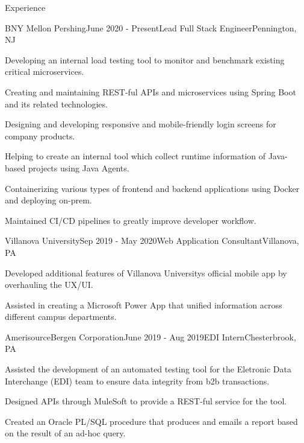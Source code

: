 \documentclass[
	11pt, %
]{resume} %
\begin{document}
\begin{rSection}{Experience}

	\begin{rSubsection}{BNY Mellon \textbar{} Pershing}{June 2020 - Present}{Lead Full Stack Engineer}{Pennington, NJ}
		\item Developing an internal load testing tool to monitor and benchmark existing critical microservices.
		\item Creating and maintaining REST-ful APIs and microservices using Spring Boot and its related technologies.
		\item Designing and developing responsive and mobile-friendly login screens for company products.
		\item Helping to create an internal tool which collect runtime information of Java-based projects using Java Agents.
		\item Containerizing various types of frontend and backend applications using Docker and deploying on-prem.
		\item Maintained CI/CD pipelines to greatly improve developer workflow.
	\end{rSubsection}


	\begin{rSubsection}{Villanova University}{Sep 2019 - May 2020}{Web Application Consultant}{Villanova, PA}
		\item Developed additional features of Villanova University\textquotesingle{}s official mobile app by overhauling the UX/UI.
		\item Assisted in creating a Microsoft Power App that unified information across different campus departments.
	\end{rSubsection}


	\begin{rSubsection}{AmerisourceBergen Corporation}{June 2019 - Aug 2019}{EDI Intern}{Chesterbrook, PA}
		\item Assisted the development of an automated testing tool for the Eletronic Data Interchange (EDI) team to ensure data integrity from b2b transactions.
		\item Designed APIs through MuleSoft to provide a REST-ful service for the tool.
		\item Created an Oracle PL/SQL procedure that produces and emails a report based on the result of an ad-hoc query.
	\end{rSubsection}


\end{rSection}
\end{document}
